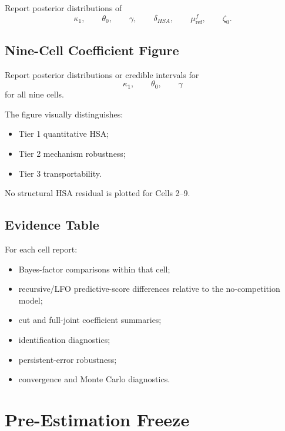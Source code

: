 \documentclass[11pt]{article}
\begin{document}
Report posterior distributions of
\begin{equation}
\kappa_1,
\qquad
\theta_0,
\qquad
\gamma,
\qquad
\delta_{HSA},
\qquad
\mu_{\mathrm{ref}}^f,
\qquad
\zeta_0.
\end{equation}

\subsection{Nine-Cell Coefficient Figure}

Report posterior distributions or credible intervals for
\begin{equation}
\kappa_1,
\qquad
\theta_0,
\qquad
\gamma
\end{equation}
for all nine cells.

The figure visually distinguishes:
\begin{itemize}
\item Tier 1 quantitative HSA;
\item Tier 2 mechanism robustness;
\item Tier 3 transportability.
\end{itemize}

No structural HSA residual is plotted for Cells 2--9.

\subsection{Evidence Table}

For each cell report:
\begin{itemize}
\item Bayes-factor comparisons within that cell;
\item recursive/LFO predictive-score differences relative to the no-competition model;
\item cut and full-joint coefficient summaries;
\item identification diagnostics;
\item persistent-error robustness;
\item convergence and Monte Carlo diagnostics.
\end{itemize}

\section{Pre-Estimation Freeze}
\end{document}
